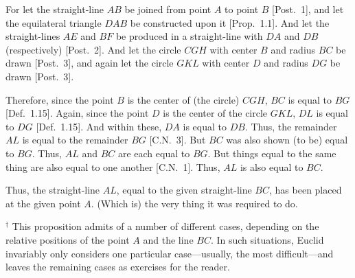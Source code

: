\begin{Parallel}{}{}
{For  let the straight-line $AB$ be joined from point $A$ to point $B$ [Post.~1], and let the
equilateral triangle $DAB$ be  constructed upon it [Prop.~1.1].  And let the
straight-lines $AE$ and $BF$ be produced in a straight-line with $DA$ and $DB$  (respectively) [Post.~2].
And let the circle $CGH$ with center $B$ and radius $BC$ be drawn
[Post.~3], and again let the circle $GKL$ with center $D$ and radius $DG$ be drawn [Post.~3].

\epsfysize=3.5in
\centerline{}

Therefore, since the point $B$ is the center of (the circle) $CGH$, $BC$ is equal to 
$BG$ [Def.~1.15]. Again, since the point $D$ is the center of the circle $GKL$, $DL$ is equal to $DG$ [Def.~1.15]. And within these,  $DA$ is equal to $DB$. Thus, the remainder $AL$ is equal to the remainder $BG$ [C.N.~3]. But $BC$ was also shown (to be)  equal to $BG$. Thus,  $AL$
and $BC$ are each equal to $BG$. But things equal to the same thing are also equal to one another [C.N.~1]. Thus, $AL$ is also equal to $BC$.

Thus, the straight-line $AL$, equal to the given straight-line $BC$,
has been placed at the given point $A$. (Which is) the very thing it was required to do.}
\end{Parallel}
{\footnotesize
\noindent $^\dag$ This proposition admits of a number
of different cases, depending on the relative positions of the point $A$
and the line $BC$. In such situations, Euclid invariably only considers one
particular case---usually, the most difficult---and leaves the remaining cases as
exercises for the reader.}

